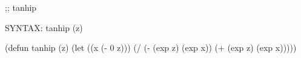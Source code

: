 \begin{aibox}{\function}
;; tanhip

SYNTAX: tanhip (z)  
\end{aibox}

\begin{aibox}{\examples}

\end{aibox}

\begin{aibox}{\comments}

\end{aibox}
\begin{aibox}{\answers}

\end{aibox}
\begin{aibox}{\othercomments}

\end{aibox}
\begin{aibox}{\pseudocode}

\end{aibox}
\begin{aibox}{\code}

(defun tanhip (z)  
	(let ((x (- 0 z)))
		(/ 
			(- (exp z) (exp x))
			(+ (exp z) (exp x)))))

\end{aibox}
